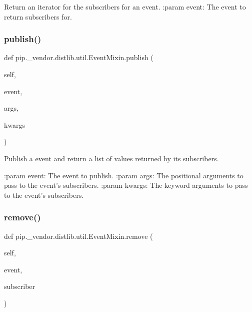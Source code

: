 \begin{DoxyVerb}Return an iterator for the subscribers for an event.
:param event: The event to return subscribers for.
\end{DoxyVerb}
 \mbox{\label{classpip_1_1__vendor_1_1distlib_1_1util_1_1EventMixin_a24812a01ae12463262e231e4d3b537c3}} 
\subsubsection{\texorpdfstring{publish()}{publish()}}
{\footnotesize\ttfamily def pip.\+\_\+vendor.\+distlib.\+util.\+Event\+Mixin.\+publish (\begin{DoxyParamCaption}\item[{}]{self,  }\item[{}]{event,  }\item[{}]{args,  }\item[{}]{kwargs }\end{DoxyParamCaption})}

\begin{DoxyVerb}Publish a event and return a list of values returned by its
subscribers.

:param event: The event to publish.
:param args: The positional arguments to pass to the event's
     subscribers.
:param kwargs: The keyword arguments to pass to the event's
       subscribers.
\end{DoxyVerb}
 \mbox{\label{classpip_1_1__vendor_1_1distlib_1_1util_1_1EventMixin_aa6ba25c788248661ab22b49e45bfb573}} 
\subsubsection{\texorpdfstring{remove()}{remove()}}
{\footnotesize\ttfamily def pip.\+\_\+vendor.\+distlib.\+util.\+Event\+Mixin.\+remove (\begin{DoxyParamCaption}\item[{}]{self,  }\item[{}]{event,  }\item[{}]{subscriber }\end{DoxyParamCaption})}

